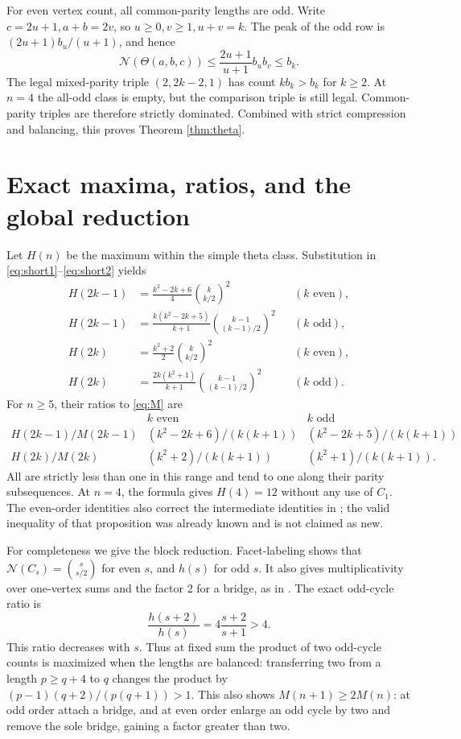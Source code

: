\documentclass[11pt]{article}
\theoremstyle{remark}
\newcommand{\Th}{\Theta}
\newcommand{\N}{\mathcal N}
\begin{document}
For even vertex count, all common-parity lengths are odd. Write
$c=2u+1,a+b=2v$, so $u\ge0,v\ge1,u+v=k$. The peak of the odd row
is $(2u+1)b_u/(u+1)$, and hence
\[
 \N(\Th(a,b,c))\le\frac{2u+1}{u+1}b_ub_v\le b_k.
\]
The legal mixed-parity triple $(2,2k-2,1)$ has count $kb_k>b_k$ for
$k\ge2$. At $n=4$ the all-odd class is empty, but the comparison triple
is still legal. Common-parity triples are therefore strictly dominated.
Combined with strict compression and balancing, this proves
Theorem \ref{thm:theta}.

\section{Exact maxima, ratios, and the global reduction}
Let $H(n)$ be the maximum within the simple theta class. Substitution
in \eqref{eq:short1}--\eqref{eq:short2} yields
\begin{align*}
 H(2k-1)&=\frac{k^2-2k+6}{4}\binom{k}{k/2}^{\!2}
 &&(k\text{ even}),\\
 H(2k-1)&=\frac{k(k^2-2k+5)}{k+1}
                  \binom{k-1}{(k-1)/2}^{\!2}
 &&(k\text{ odd}),\\
 H(2k)&=\frac{k^2+2}{2}\binom{k}{k/2}^{\!2}
 &&(k\text{ even}),\\
 H(2k)&=\frac{2k(k^2+1)}{k+1}
                  \binom{k-1}{(k-1)/2}^{\!2}
 &&(k\text{ odd}).
\end{align*}
For $n\ge5$, their ratios to \eqref{eq:M} are
\begin{equation}\label{eq:ratios}
\begin{array}{c|cc}
 &k\text{ even}&k\text{ odd}\\\hline
H(2k-1)/M(2k-1)&(k^2-2k+6)/(k(k+1))&(k^2-2k+5)/(k(k+1))\\[2pt]
H(2k)/M(2k)&(k^2+2)/(k(k+1))&(k^2+1)/(k(k+1)).
\end{array}
\end{equation}
All are strictly less than one in this range and tend to one along their
parity subsequences. At $n=4$, the formula gives $H(4)=12$ without any
use of $C_1$. The even-order identities also correct the intermediate
identities in \cite[Proposition 30]{BB}; the valid inequality of that
proposition was already known and is not claimed as new.

For completeness we give the block reduction. Facet-labeling shows that
$\N(C_s)=\binom{s}{s/2}$ for even $s$, and $h(s)$ for odd $s$.
It also gives multiplicativity over one-vertex sums and the factor 2
for a bridge, as in \cite[Proposition 9 and Corollary 19]{BB}.
The exact odd-cycle ratio is
\begin{equation}\label{eq:h}
 \frac{h(s+2)}{h(s)}=4\frac{s+2}{s+1}>4.
\end{equation}
This ratio decreases with $s$. Thus at fixed sum the product of two
odd-cycle counts is maximized when the lengths are balanced: transferring
two from a length $p\ge q+4$ to $q$ changes the product by
$(p-1)(q+2)/(p(q+1))>1$. This also shows $M(n+1)\ge2M(n)$: at odd
order attach a bridge, and at even order enlarge an odd cycle by two
and remove the sole bridge, gaining a factor greater than two.
\end{document}
